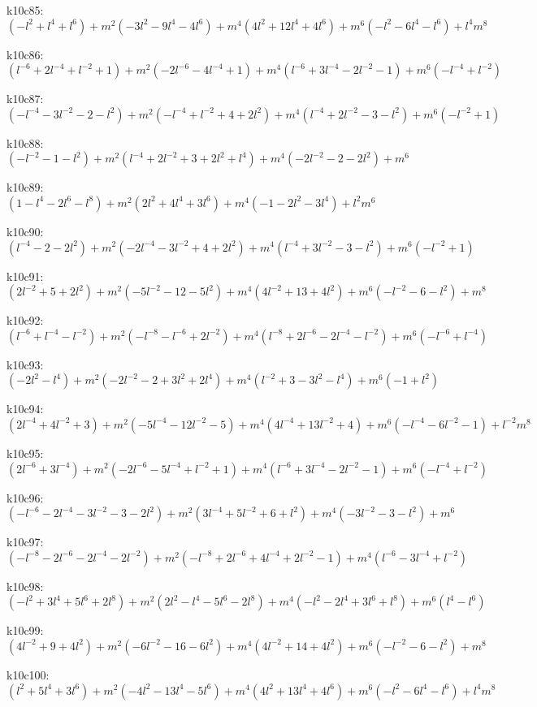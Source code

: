 k10c85: $ (-l^{2}+l^{4}+l^{6})  +m^{2}(-3l^{2}-9l^{4}-4l^{6})  +m^{4}(4l^{2}+12l^{4}+4l^{6})  +m^{6}(-l^{2}-6l^{4}-l^{6})  +l^{4}m^{8} $ 

k10c86: $ (l^{-6}+2l^{-4}+l^{-2}+1)  +m^{2}(-2l^{-6}-4l^{-4}+1)  +m^{4}(l^{-6}+3l^{-4}-2l^{-2}-1)  +m^{6}(-l^{-4}+l^{-2}) $ 

k10c87: $ (-l^{-4}-3l^{-2}-2-l^{2})  +m^{2}(-l^{-4}+l^{-2}+4+2l^{2})  +m^{4}(l^{-4}+2l^{-2}-3-l^{2})  +m^{6}(-l^{-2}+1) $ 

k10c88: $ (-l^{-2}-1-l^{2})  +m^{2}(l^{-4}+2l^{-2}+3+2l^{2}+l^{4})  +m^{4}(-2l^{-2}-2-2l^{2})  +m^{6} $ 

k10c89: $ (1-l^{4}-2l^{6}-l^{8})  +m^{2}(2l^{2}+4l^{4}+3l^{6})  +m^{4}(-1-2l^{2}-3l^{4})  +l^{2}m^{6} $ 

k10c90: $ (l^{-4}-2-2l^{2})  +m^{2}(-2l^{-4}-3l^{-2}+4+2l^{2})  +m^{4}(l^{-4}+3l^{-2}-3-l^{2})  +m^{6}(-l^{-2}+1) $ 

k10c91: $ (2l^{-2}+5+2l^{2})  +m^{2}(-5l^{-2}-12-5l^{2})  +m^{4}(4l^{-2}+13+4l^{2})  +m^{6}(-l^{-2}-6-l^{2})  +m^{8} $ 

k10c92: $ (l^{-6}+l^{-4}-l^{-2})  +m^{2}(-l^{-8}-l^{-6}+2l^{-2})  +m^{4}(l^{-8}+2l^{-6}-2l^{-4}-l^{-2})  +m^{6}(-l^{-6}+l^{-4}) $ 

k10c93: $ (-2l^{2}-l^{4})  +m^{2}(-2l^{-2}-2+3l^{2}+2l^{4})  +m^{4}(l^{-2}+3-3l^{2}-l^{4})  +m^{6}(-1+l^{2}) $ 

k10c94: $ (2l^{-4}+4l^{-2}+3)  +m^{2}(-5l^{-4}-12l^{-2}-5)  +m^{4}(4l^{-4}+13l^{-2}+4)  +m^{6}(-l^{-4}-6l^{-2}-1)  +l^{-2}m^{8} $ 

k10c95: $ (2l^{-6}+3l^{-4})  +m^{2}(-2l^{-6}-5l^{-4}+l^{-2}+1)  +m^{4}(l^{-6}+3l^{-4}-2l^{-2}-1)  +m^{6}(-l^{-4}+l^{-2}) $ 

k10c96: $ (-l^{-6}-2l^{-4}-3l^{-2}-3-2l^{2})  +m^{2}(3l^{-4}+5l^{-2}+6+l^{2})  +m^{4}(-3l^{-2}-3-l^{2})  +m^{6} $ 

k10c97: $ (-l^{-8}-2l^{-6}-2l^{-4}-2l^{-2})  +m^{2}(-l^{-8}+2l^{-6}+4l^{-4}+2l^{-2}-1)  +m^{4}(l^{-6}-3l^{-4}+l^{-2}) $ 

k10c98: $ (-l^{2}+3l^{4}+5l^{6}+2l^{8})  +m^{2}(2l^{2}-l^{4}-5l^{6}-2l^{8})  +m^{4}(-l^{2}-2l^{4}+3l^{6}+l^{8})  +m^{6}(l^{4}-l^{6}) $ 

k10c99: $ (4l^{-2}+9+4l^{2})  +m^{2}(-6l^{-2}-16-6l^{2})  +m^{4}(4l^{-2}+14+4l^{2})  +m^{6}(-l^{-2}-6-l^{2})  +m^{8} $ 

k10c100: $ (l^{2}+5l^{4}+3l^{6})  +m^{2}(-4l^{2}-13l^{4}-5l^{6})  +m^{4}(4l^{2}+13l^{4}+4l^{6})  +m^{6}(-l^{2}-6l^{4}-l^{6})  +l^{4}m^{8} $ 

